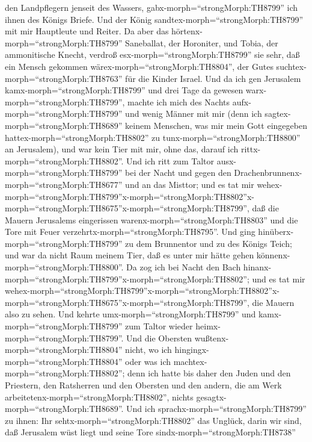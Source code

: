 den Landpflegern jenseit des Wassers, gabx-morph=``strongMorph:TH8799''
ich ihnen des Königs Briefe. Und der König
sandtex-morph=``strongMorph:TH8799'' mit mir Hauptleute und Reiter.
 Da aber das hörtenx-morph=``strongMorph:TH8799''
Saneballat, der Horoniter, und Tobia, der ammonitische Knecht, verdroß
esx-morph=``strongMorph:TH8799'' sie sehr, daß ein Mensch gekommen
wärex-morph=``strongMorph:TH8804'', der Gutes
suchtex-morph=``strongMorph:TH8763'' für die Kinder Israel.
 Und da ich gen Jerusalem kamx-morph=``strongMorph:TH8799''
und drei Tage da gewesen warx-morph=``strongMorph:TH8799'',
 machte ich mich des Nachts
aufx-morph=``strongMorph:TH8799'' und wenig Männer mit mir (denn ich
sagtex-morph=``strongMorph:TH8689'' keinem Menschen, was mir mein Gott
eingegeben hattex-morph=``strongMorph:TH8802'' zu
tunx-morph=``strongMorph:TH8800'' an Jerusalem), und war kein Tier mit
mir, ohne das, darauf ich rittx-morph=``strongMorph:TH8802''.
 Und ich ritt zum Taltor ausx-morph=``strongMorph:TH8799''
bei der Nacht und gegen den Drachenbrunnenx-morph=``strongMorph:TH8677''
und an das Misttor; und es tat mir
wehex-morph=``strongMorph:TH8799''x-morph=``strongMorph:TH8802''\textbar x-morph=``strongMorph:TH8675''x-morph=``strongMorph:TH8799'',
daß die Mauern Jerusalems eingerissen
warenx-morph=``strongMorph:TH8803'' und die Tore mit Feuer
verzehrtx-morph=``strongMorph:TH8795''.  Und ging
hinüberx-morph=``strongMorph:TH8799'' zu dem Brunnentor und zu des
Königs Teich; und war da nicht Raum meinem Tier, daß es unter mir hätte
gehen könnenx-morph=``strongMorph:TH8800''.  Da zog ich bei
Nacht den Bach
hinanx-morph=``strongMorph:TH8799''x-morph=``strongMorph:TH8802''; und
es tat mir
wehex-morph=``strongMorph:TH8799''x-morph=``strongMorph:TH8802''\textbar x-morph=``strongMorph:TH8675''x-morph=``strongMorph:TH8799'',
die Mauern also zu sehen. Und kehrte umx-morph=``strongMorph:TH8799''
und kamx-morph=``strongMorph:TH8799'' zum Taltor wieder
heimx-morph=``strongMorph:TH8799''.  Und die Obersten
wußtenx-morph=``strongMorph:TH8804'' nicht, wo ich
hingingx-morph=``strongMorph:TH8804'' oder was ich
machtex-morph=``strongMorph:TH8802''; denn ich hatte bis daher den Juden
und den Priestern, den Ratsherren und den Obersten und den andern, die
am Werk arbeitetenx-morph=``strongMorph:TH8802'', nichts
gesagtx-morph=``strongMorph:TH8689''.  Und ich
sprachx-morph=``strongMorph:TH8799'' zu ihnen: Ihr
sehtx-morph=``strongMorph:TH8802'' das Unglück, darin wir sind, daß
Jerusalem wüst liegt und seine Tore sindx-morph=``strongMorph:TH8738''
